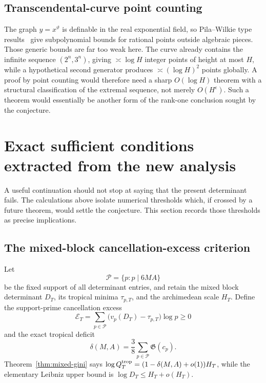 \documentclass[11pt,oneside]{article}
\theoremstyle{definition}
\theoremstyle{remark}
\begin{document}
\subsection{Transcendental-curve point counting}

The graph $y=x^\vartheta$ is definable in the real exponential field, so Pila--Wilkie type
results~\cite{PilaWilkie2006} give subpolynomial bounds for rational points outside algebraic pieces.  Those generic
bounds are far too weak here.  The curve already contains the infinite sequence
$(2^n,3^n)$, giving $\asymp\log H$ integer points of height at most $H$, while a hypothetical
second generator produces $\asymp(\log H)^2$ points globally.  A proof by point counting would
therefore need a sharp $O(\log H)$ theorem with a structural classification of the extremal
sequence, not merely $O(H^\epsilon)$.  Such a theorem would essentially be another form of the
rank-one conclusion sought by the conjecture.

\section{Exact sufficient conditions extracted from the new analysis}
\label{sec:sufficient}

A useful continuation should not stop at saying that the present determinant fails.  The
calculations above isolate numerical thresholds which, if crossed by a future theorem, would
settle the conjecture.  This section records those thresholds as precise implications.

\subsection{The mixed-block cancellation-excess criterion}

Let
\[
 \mathcal P=\{p:p\mid6MA\}
\]
be the fixed support of all determinant entries, and retain the mixed block determinant $D_T$,
its tropical minima $\tau_{p,T}$, and the archimedean scale $H_T$.  Define the support-prime
cancellation excess
\begin{equation}\label{eq:cancellation-excess}
 \mathcal E_T
 =\sum_{p\in\mathcal P}
   \bigl(v_p(D_T)-\tau_{p,T}\bigr)\log p
 \ge0
\end{equation}
and the exact tropical deficit
\begin{equation}\label{eq:tropical-deficit}
 \delta(M,A)=\frac38\sum_{p\in\mathcal P}\mathfrak G(c_p).
\end{equation}
Theorem~\ref{thm:mixed-gini} says
$\log Q_T^{\rm trop}=(1-\delta(M,A)+o(1))H_T$, while the elementary Leibniz upper bound is
$\log D_T\le H_T+o(H_T)$.
\end{document}
